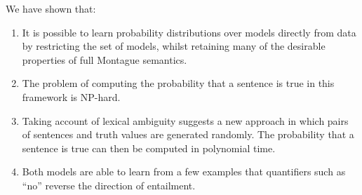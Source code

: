 \documentclass[manuscript]{clv2}
\begin{document}
We have shown that:

\begin{enumerate}
\item It is possible to learn probability
  distributions over models directly from data by restricting the set of models,
  whilst retaining many of the desirable properties of full Montague
  semantics.
\item The problem of computing the probability that a
  sentence is true in this framework is NP-hard.
\item Taking account of lexical ambiguity suggests a new
  approach in which pairs of sentences and truth values are generated
  randomly. The probability that a sentence is true can then be
  computed in polynomial time.
\item Both models are able to learn from a few examples
  that quantifiers such as ``no'' reverse the direction of entailment.
\end{enumerate}

%


\end{document}
